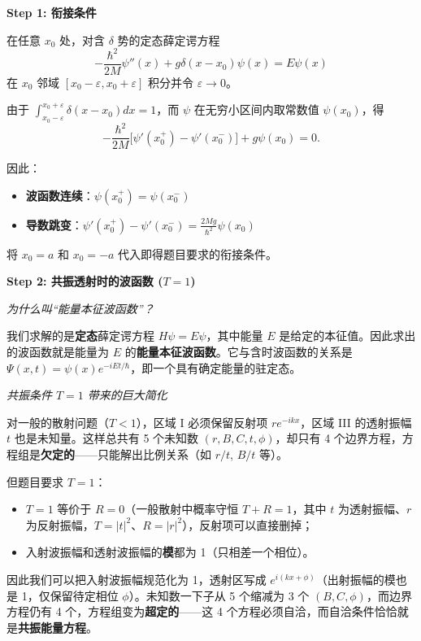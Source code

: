 \begin{derivationbox}[标准解题过程]
\textbf{Step 1: 衔接条件}

在任意 $x_0$ 处，对含 $\delta$ 势的定态薛定谔方程
\[
-\frac{\hbar^2}{2M}\psi''(x) + g\delta(x-x_0)\psi(x) = E\psi(x)
\]
在 $x_0$ 邻域 $[x_0-\varepsilon, x_0+\varepsilon]$ 积分并令 $\varepsilon\to 0$。

由于 $\int_{x_0-\varepsilon}^{x_0+\varepsilon}\delta(x-x_0)dx = 1$，而 $\psi$ 在无穷小区间内取常数值 $\psi(x_0)$，得
\[
-\frac{\hbar^2}{2M}\bigl[\psi'(x_0^+) - \psi'(x_0^-)\bigr] + g\psi(x_0) = 0.
\]

因此：
\begin{itemize}[nosep]
    \item \textbf{波函数连续}：$\psi(x_0^+) = \psi(x_0^-)$
    \item \textbf{导数跳变}：$\displaystyle \psi'(x_0^+) - \psi'(x_0^-) = \frac{2Mg}{\hbar^2}\psi(x_0)$
\end{itemize}
将 $x_0 = a$ 和 $x_0 = -a$ 代入即得题目要求的衔接条件。

\textbf{Step 2: 共振透射时的波函数 ($T=1$)}

\textit{为什么叫``能量本征波函数''？}

我们求解的是\textbf{定态}薛定谔方程 $H\psi = E\psi$，其中能量 $E$ 是给定的本征值。因此求出的波函数就是能量为 $E$ 的\textbf{能量本征波函数}。它与含时波函数的关系是 $\Psi(x,t)=\psi(x)e^{-iEt/\hbar}$，即一个具有确定能量的驻定态。

\textit{共振条件 $T=1$ 带来的巨大简化}

对一般的散射问题（$T<1$），区域 I 必须保留反射项 $re^{-ikx}$，区域 III 的透射振幅 $t$ 也是未知量。这样总共有 5 个未知数 $(r,B,C,t,\phi)$，却只有 4 个边界方程，方程组是\textbf{欠定的}——只能解出比例关系（如 $r/t$, $B/t$ 等）。

但题目要求 $T=1$：
\begin{itemize}[nosep]
    \item $T=1$ 等价于 $R=0$（一般散射中概率守恒 $T+R=1$，其中 $t$ 为透射振幅、$r$ 为反射振幅，$T=|t|^2$、$R=|r|^2$），反射项可以直接删掉；
    \item 入射波振幅和透射波振幅的\textbf{模}都为 1（只相差一个相位）。
\end{itemize}
因此我们可以把入射波振幅规范化为 1，透射区写成 $e^{i(kx+\phi)}$（出射振幅的模也是 1，仅保留待定相位 $\phi$）。未知数一下子从 5 个缩减为 3 个 $(B,C,\phi)$，而边界方程仍有 4 个，方程组变为\textbf{超定的}——这 4 个方程必须自洽，而自洽条件恰恰就是\textbf{共振能量方程}。


\end{derivationbox}
